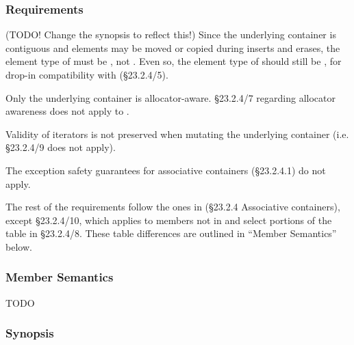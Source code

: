 \subsubsection{ Requirements}

(TODO! Change the synopsis to reflect this!) Since the underlying container is
contiguous and elements may be moved or copied during inserts and erases, the
element type of  must be , not
.  Even so, the element type of 
should still be , for drop-in compatibility with
 (\S23.2.4/5).

Only the underlying container is allocator-aware.  \S23.2.4/7 regarding
allocator awareness does not apply to .

Validity of iterators is not preserved when mutating the underlying container
(i.e. \S23.2.4/9 does not apply).

The exception safety guarantees for associative containers (\S23.2.4.1) do not
apply.

The rest of the requirements follow the ones in (\S23.2.4 Associative
containers), except \S23.2.4/10, which applies to members not in
 and select portions of the table in \S23.2.4/8.  These table
differences are outlined in ``Member Semantics'' below.

\subsubsection{Member Semantics}

TODO

\subsubsection{ Synopsis}


